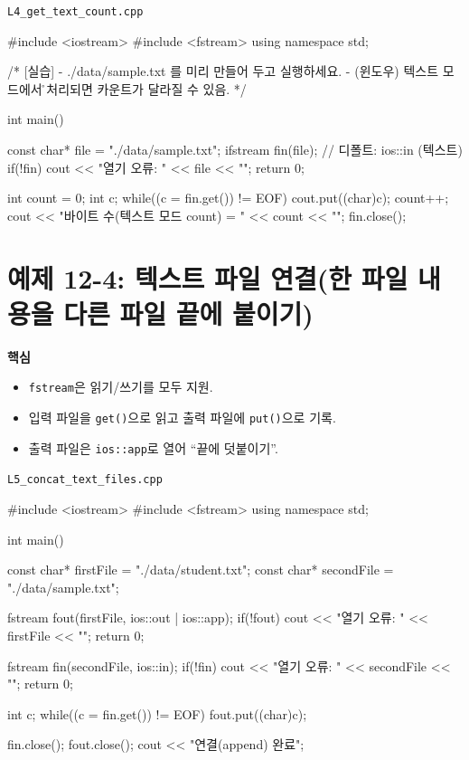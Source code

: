 \documentclass[11pt,a4paper]{article}
\newcommand{\filetag}[1]{\texttt{\color{Accent}#1}}
\begin{document}
\noindent\filetag{L4\_get\_text\_count.cpp}
\begin{cppcode}
#include <iostream>
#include <fstream>
using namespace std;

/*
[실습]
- ./data/sample.txt 를 미리 만들어 두고 실행하세요.
- (윈도우) 텍스트 모드에서 \r{}  처리되면 카운트가 달라질 수 있음.
*/

int main() {
    const char* file = "./data/sample.txt";
    ifstream fin(file); // 디폴트: ios::in (텍스트)
    if(!fin) {
        cout << "열기 오류: " << file << "\n";
        return 0;
    }

    int count = 0;
    int c;
    while((c = fin.get()) != EOF) {
        cout.put((char)c);
        count++;
    }
    cout << " 바이트 수(텍스트 모드 count) = " << count << "\n";
    fin.close();
}
\end{cppcode}

\section{예제 12-4: 텍스트 파일 연결(한 파일 내용을 다른 파일 끝에 붙이기)}
\begin{GoalBox}
\textbf{핵심}
\begin{itemize}[leftmargin=18pt]
  \item \texttt{fstream}은 읽기/쓰기를 모두 지원. %
  \item 입력 파일을 \texttt{get()}으로 읽고 출력 파일에 \texttt{put()}으로 기록.
  \item 출력 파일은 \texttt{ios::app}로 열어 ``끝에 덧붙이기''.
\end{itemize}
\end{GoalBox}

\noindent\filetag{L5\_concat\_text\_files.cpp}
\begin{cppcode}
#include <iostream>
#include <fstream>
using namespace std;

int main() {
    const char* firstFile  = "./data/student.txt";
    const char* secondFile = "./data/sample.txt";

    fstream fout(firstFile, ios::out | ios::app);
    if(!fout) { cout << "열기 오류: " << firstFile << "\n"; return 0; }

    fstream fin(secondFile, ios::in);
    if(!fin) { cout << "열기 오류: " << secondFile << "\n"; return 0; }

    int c;
    while((c = fin.get()) != EOF) {
        fout.put((char)c);
    }

    fin.close();
    fout.close();
    cout << "연결(append) 완료\n";
}
\end{cppcode}
\end{document}
